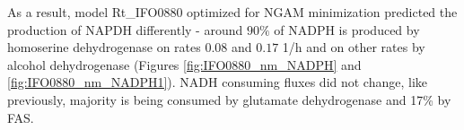 As a result, model Rt\_IFO0880 optimized for NGAM minimization predicted the production of NAPDH differently - around $90\%$ of NADPH is produced by homoserine dehydrogenase on rates $0.08$ and $0.17$ \unit{1/h} and on other rates by alcohol dehydrogenase (Figures \ref{fig:IFO0880_nm_NADPH} and \ref{fig:IFO0880_nm_NADPH1}). NADH consuming fluxes did not change, like previously, majority is being consumed by glutamate dehydrogenase and 17\% by FAS.  

